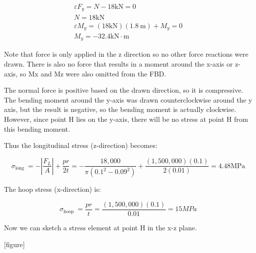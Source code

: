 \documentclass[
  letterpaper,
  DIV=11,
  numbers=noendperiod]{scrreprt}
\begin{document}
\begin{tcolorbox}
\begin{tcolorbox}
\[
\begin{gathered}
\varepsilon F_y=N-18 \mathrm{kN}=0 \\
N=18 \mathrm{kN} \\
\varepsilon M_y=(18 \mathrm{kN})(1.8 \mathrm{~m})+M_y=0 \\
M_y=-32.4 \mathrm{kN} \cdot \mathrm{m}
\end{gathered}
\]

Note that force is only applied in the z direction so no other force
reactions were drawn. There is also no force that results in a moment
around the x-axis or z-axis, so Mx and Mz were also omitted from the
FBD.

The normal force is positive based on the drawn direction, so it is
compressive. The bending moment around the y-axis was drawn
counterclockwise around the y axis, but the result is negative, so the
bending moment is actually clockwise. However, since point H lies on the
y-axis, there will be no stress at point H from this bending moment.~

Thus the longitudinal stress (z-direction) becomes:

\[
\sigma_{\text {long }}=-\left|\frac{F_L}{A}\right|+\frac{p r}{2 t}=-\frac{18,000}{\pi\left(0.1^2-0.09^2\right)}+\frac{(1,500,000)(0.1)}{2(0.01)}=4.48 \mathrm{MPa}
\]

The hoop stress (x-direction) is:

\[
\sigma_{\text {hoop }}=\frac{p r}{t}=\frac{(1,500,000)(0.1)}{0.01}=15 M P a
\]

Now we can sketch a stress element at point H in the x-z plane.

{[}figure{]}

\end{tcolorbox}

\end{tcolorbox}
\end{document}
